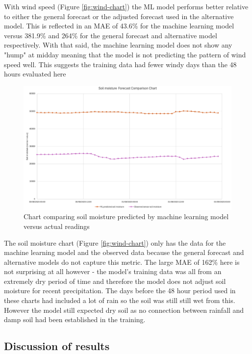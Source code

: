 With wind speed (Figure \ref{fig:wind-chart}) the ML model performs better
relative to either the general forecast or the adjusted forecast used in the
alternative model. This is reflected in an MAE of 43.6\% for the machine
learning model versus 381.9\% and 264\% for the general forecast and alternative
model respectively. With that said, the machine learning model does not show any
"hump" at midday meaning that the model is not predicting the pattern of wind
speed well. This suggests the training data had fewer windy days than the 48
hours evaluated here

\begin{figure}[H]
    \centering
    \includegraphics[width=1\textwidth]{contents/part-4/fig4/soil-graph.png}
    \caption{Chart comparing soil moisture predicted by machine learning model versus actual readings}
    \label{fig:soil-chart}
\end{figure}

The soil moisture chart (Figure \ref{fig:wind-chart}) only has the data for the
machine learning model and the observed data because the general forecast and
alternative models do not capture this metric. The large MAE of 162\% here is
not surprising at all however - the model's training data was all from an
extremely dry period of time and therefore the model does not adjust soil
moisture for recent precipitation. The days before the 48 hour period used in
these charts had included a lot of rain so the soil was still still wet from
this. However the model still expected dry soil as no connection between
rainfall and damp soil had been established in the training.

\subsection{Discussion of results}

